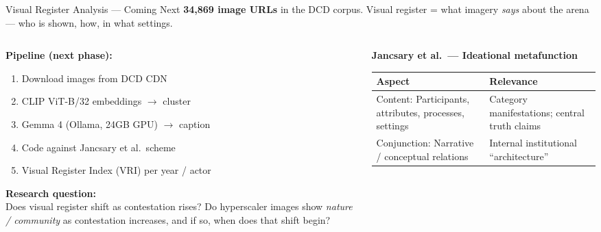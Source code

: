 \documentclass[aspectratio=169,11pt]{beamer}
\newcommand{\iconfull}[2]{\textcolor{#1}{\faIcon{#2}}}
\begin{document}
\begin{frame}{\iconfull{dcblue}{images}\enspace Visual Register Analysis — Coming Next}
\vspace{0.1em}
{\scriptsize \textbf{34,869 image URLs} in the DCD corpus. Visual register = what imagery \textit{says} about the arena — who is shown, how, in what settings.}
\vspace{0.4em}

\begin{columns}[T]
\begin{column}{0.54\textwidth}
{\scriptsize
\textbf{Pipeline (next phase):}\\[0.2em]
\begin{enumerate}\setlength\itemsep{0.1em}
  \item Download images from DCD CDN
  \item CLIP ViT-B/32 embeddings $\to$ cluster
  \item Gemma 4 (Ollama, 24GB GPU) $\to$ caption
  \item Code against Jancsary et al.\ scheme
  \item Visual Register Index (VRI) per year / actor
\end{enumerate}
\vspace{0.4em}
\textbf{Research question:}\\[0.2em]
Does visual register shift as contestation rises? Do hyperscaler images show \textit{nature / community} as contestation increases, and if so, when does that shift begin?
}
\end{column}
\begin{column}{0.43\textwidth}
{\tiny\setlength{\tabcolsep}{3pt}
\textbf{Jancsary et al.\ — Ideational metafunction}\\[0.2em]
\begin{tabular}{@{}p{1.8cm}p{2.6cm}@{}}
\toprule
\textbf{Aspect} & \textbf{Relevance} \\
\midrule
Content: Participants, attributes, processes, settings & Category manifestations; central truth claims \\[0.2em]
Conjunction: Narrative / conceptual relations & Internal institutional ``architecture'' \\
\bottomrule
\end{tabular}
\vspace{0.4em}
}
\end{column}
\end{columns}
\end{frame}
\end{document}
